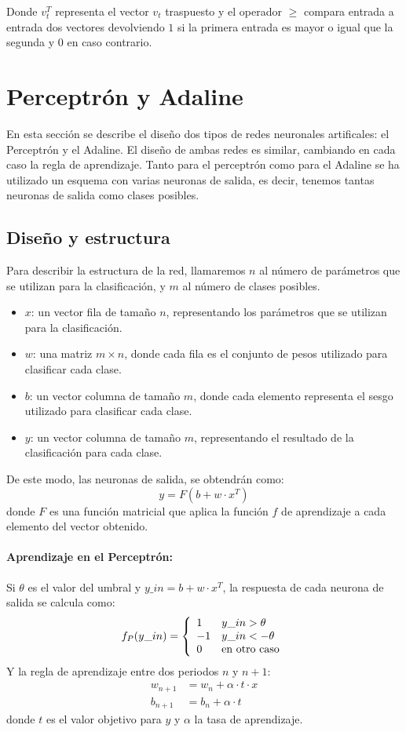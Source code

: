 \documentclass[spanish]{assignment}
\begin{document}
	Donde $v_t^T$ representa el vector $v_t$ traspuesto y el operador $\ge$ compara entrada a entrada dos vectores devolviendo $1$ si la primera entrada es mayor o igual que la segunda y $0$ en caso contrario.
	
	\newpage
	\section{Perceptrón y Adaline}
	En esta sección se describe el diseño dos tipos de redes neuronales artificales: el Perceptrón y el Adaline. El diseño de ambas redes es similar, cambiando en cada caso la regla de aprendizaje. Tanto para el perceptrón como para el Adaline se ha utilizado un esquema con varias neuronas de salida, es decir, tenemos tantas neuronas de salida como clases posibles.
	
	\subsection{Diseño y estructura}
	Para describir la estructura de la red, llamaremos $n$ al número de parámetros que se utilizan para la clasificación, y $m$ al número de clases posibles.
	\begin{itemize}
		\item $x$: un vector fila de tamaño $n$, representando los parámetros que se utilizan para la clasificación.
		\item $w$: una matriz $m\times n$, donde cada fila es el conjunto de pesos utilizado para clasificar cada clase.
		\item $b$: un vector columna de tamaño $m$, donde cada elemento representa el sesgo utilizado para clasificar cada clase.
		\item $y$: un vector columna de tamaño $m$, representando el resultado de la clasificación para cada clase.
	\end{itemize}
	De este modo, las neuronas de salida, se obtendrán como:
	$$y = F\left(b + w\cdot x^T \right)$$
	donde $F$ es una función matricial que aplica la función $f$ de aprendizaje a cada elemento del vector obtenido.
	
	\paragraph{Aprendizaje en el Perceptrón:}\mbox{}

	Si $\theta$ es el valor del umbral y $y\_in = b + w\cdot x^T$, la respuesta de cada neurona de salida se calcula como:
	\begin{equation*}
		f_P(y\_in) = \left\{
		\begin{array}{l l}
			1 & y\_in > \theta\\
			-1 & y\_in < -\theta\\
			0 & \text{en otro caso}
		\end{array}
		\right.
	\end{equation*}
	Y la regla de aprendizaje entre dos periodos $n$ y $n+1$:
	\begin{align*}
		w_{n+1} &= w_n + \alpha\cdot t\cdot x\\
		b_{n+1} &= b_n + \alpha\cdot t
	\end{align*}
	donde $t$ es el valor objetivo para $y$ y $\alpha$ la tasa de aprendizaje.
	
\end{document}
